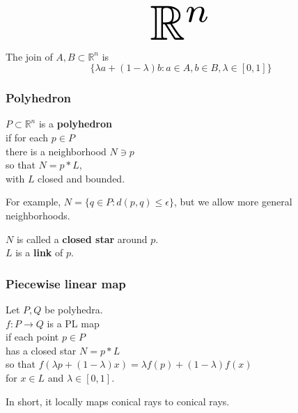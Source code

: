 \documentclass[14pt]{beamer}
\newcommand{\join}{\ast}
\begin{document}


\begin{frame}
\vfill
 $$\scalebox{5}{$\mathbb{R}^n$}$$
\vfill
\end{frame}

\begin{frame}
The join of $A, B \subset \mathbb{R}^n$ is
$$
\{ \lambda a + (1-\lambda) b : a \in A, b \in B, \lambda \in [0,1] \}
$$
\end{frame}

\begin{frame}
  \frametitle{Polyhedron}

  $P \subset \mathbb{R}^n$ is a \textbf{polyhedron} \\
  if for each $p \in P$ \\
  there is a neighborhood $N \ni p$ \\
  so that $N = p \join L$, \\
  with $L$ closed and bounded.

  \vfill
  \pause
  For example, $N = \{ q \in P : d(p,q) \leq \epsilon \}$,
  but we allow more general neighborhoods.

  \vfill
  \pause
  $N$ is called a \textbf{closed star} around $p$. \\
  $L$ is a \textbf{link} of $p$.

\end{frame}

\begin{frame}
  \frametitle{Piecewise linear map}
  Let $P, Q$ be polyhedra. \\
  $f : P \to Q$ is a PL map \\
  if each point $p \in P$ \\
  has a closed star $N = p \join L$ \\
  so that $f(\lambda p + (1-\lambda) x) = \lambda f(p) + (1 - \lambda)
  f(x)$ \\
  for $x \in L$ and $\lambda \in [0,1]$.

  \vfill

  In short, it locally maps conical rays to conical rays.

\end{frame}
\end{document}
